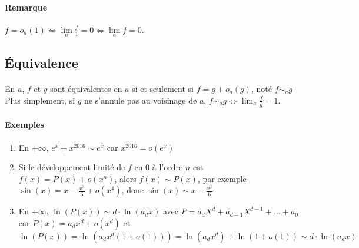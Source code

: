 \documentclass[]{article}
\begin{document}
\paragraph{Remarque}
$f=o_a(1) \Longleftrightarrow \lim\limits_{a} \frac{f}{1} = 0 \Longleftrightarrow \lim\limits_{a} f = 0$.

\subsection{Équivalence}

\paragraph[Définition]{}
En $a$, $f$ et $g$ sont équivalentes en $a$ si et seulement si $f=g+o_a(g)$, noté $f \sim_a g$
Plus simplement, si $g$ ne s'annule pas au voisinage de $a$, $\displaystyle f \sim_a g \Leftrightarrow \lim_a \frac{f}{g}=1$.

\paragraph{Exemples}
\begin{enumerate}
	\item En $+ \infty$, $e^x + x^{2016} \sim e^x$ car $x^{2016}=o(e^x)$
	
	\item Si le développement limité de $f$ en $0$ à l'ordre $n$ est $f(x)=P(x)+o(x^n)$, alors $f(x) \sim P(x)$, par exemple $\sin(x)=x-\frac{x^3}{6}+o(x^4)$, donc $\sin(x) \sim x-\frac{x^3}{6}$.
	
	\item En $+\infty$, $\ln(P(x)) \sim d \cdot \ln(a_dx)$ avec $P = a_d X^d + a_{d-1}X^{d-1} + ... + a_0$ car $P(x) = a_d x^d + o(x^d)$ et $\ln(P(x))=\ln(a_d x^d(1+o(1)))=\ln(a_dx^d)+\ln(1+o(1)) \sim d \cdot \ln(a_d x)$
\end{enumerate}
\end{document}

